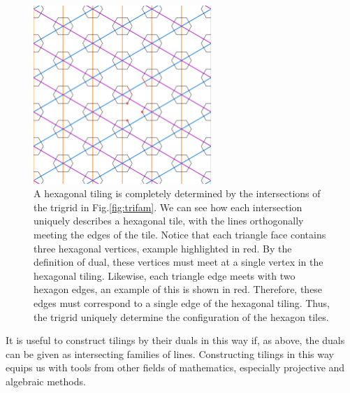 \documentclass[
  oneside,
  11pt, a4paper,
  footinclude=true,
  headinclude=true,
  cleardoublepage=empty
]{scrbook}
\begin{document}
\begin{figure}[H]
\centering
\includegraphics[width=0.6\textwidth]{HexagonDualSmall}
\caption{A hexagonal tiling is completely determined by the intersections of the trigrid in Fig.\ref{fig:trifam}. We can see how each intersection uniquely describes a hexagonal tile, with the lines orthogonally meeting the edges of the tile. Notice that each triangle face contains three hexagonal vertices, example highlighted in red. By the definition of dual, these vertices must meet at a single vertex in the hexagonal tiling. Likewise, each triangle edge meets with two hexagon edges, an example of this is shown in red. Therefore, these edges must correspond to a single edge of the hexagonal tiling. Thus, the trigrid uniquely determine the configuration of the hexagon tiles.}
\label{fig:hexsmall}
\end{figure}

It is useful to construct tilings by their duals in this way if, as above, the duals can be given as intersecting families of lines. Constructing tilings in this way equips us with tools from other fields of mathematics, especially projective and algebraic methods.
\end{document}
